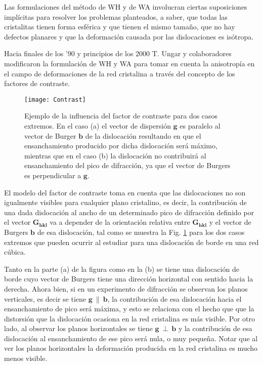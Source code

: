 Las formulaciones del método de WH y de WA involucran ciertas suposiciones implícitas para resolver los problemas planteados, a saber, que todas las cristalitas tienen forma esférica y que tienen el mismo tamaño, que no hay defectos planares y que la deformación causada por las dislocaciones es isótropa. 

Hacia finales de los '90 y principios de los 2000 T. Ungar y colaboradores modificaron la formulación de WH y WA para tomar en cuenta la anisotropía en el campo de deformaciones de la red cristalina a través del concepto de los factores de contraste\cite{Csiszar2011,Stoica2014,Ungar2001274,Ungar1999,Ungar1999992,Dragomir2002104,Klimanek1988}.

\begin{figure}[!htb]
  \centering
  \texttt{[image: Contrast]}
  \caption{Ejemplo de la influencia del factor de contraste para dos casos extremos. En el caso (a) el vector de dispersión $\mathbf{g}$ es paralelo al vector de Burger $\mathbf{b}$ de la dislocación resultando en que el ensanchamiento producido por dicha dislocación será máximo, mientras que en el caso (b) la dislocación no contribuirá al ensanchamiento del pico de difracción, ya que el vector de Burgers es perpendicular a $\mathbf{g}$.}
  \label{fig:contrast}
\end{figure}

El modelo del factor de contraste toma en cuenta que las dislocaciones no son igualmente visibles para cualquier plano cristalino, es decir, la contribución de una dada dislocación al ancho de un determinado pico de difracción definido por el vector $\mathbf{G_{hkl}}$ va a depender de la orientación relativa entre $\mathbf{G_{hkl}}$ y el vector de Burgers $\mathbf{b}$ de esa dislocación, tal como se muestra la Fig. \ref{fig:contrast} para los dos casos extremos que pueden ocurrir al estudiar para una dislocación de borde en una red cúbica.

Tanto en la parte (a) de la figura como en la (b) se tiene una dislocación de borde cuyo vector de Burgers tiene una dirección horizontal con sentido hacia la derecha. 
Ahora bien, si en un experimento de difracción se observan los planos verticales, es decir se tiene $\mathbf{g} \ \parallel \ \mathbf{b}$, la contribución de esa dislocación hacia el ensanchamiento de pico será máxima, y esto se relaciona con el hecho que que la distorsión que la dislocación ocasiona en la red cristalina es más visible.
Por otro lado, al observar los planos horizontales se tiene $\mathbf{g} \ \perp \ \mathbf{b}$ y la contribución de esa dislocación al ensanchamiento de ese pico será nula, o muy pequeña.
Notar que al ver los planos horizontales la deformación producida en la red cristalina es mucho menos visible.

